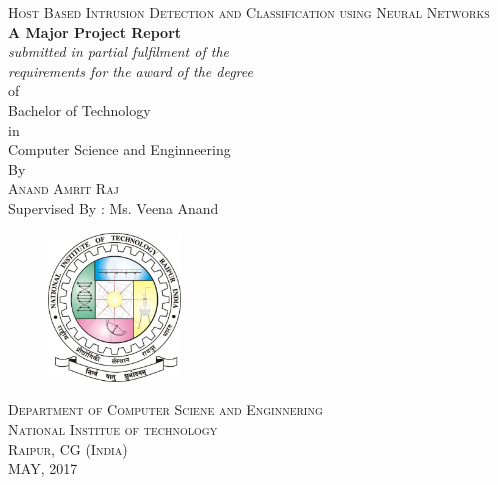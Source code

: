 \documentclass[12pt]{article}
\newcommand{\projectTitle}{Host Based Intrusion Detection and Classification using Neural Networks}
\theoremstyle{definition}
\begin{document}
	\begin{titlepage}
		\vspace*{\fill}
		\begin{center}
			\textsc{\Large \projectTitle}\\
			[0.5in]
			\textbf{A Major Project Report}\\
			[.25in]
			\textit{submitted in partial fulfilment of the} \\
			\textit{requirements for the award of the degree}\\
			[.25in]
			of\\
			[.25in]
			Bachelor of Technology \\
			[.25in]
			in\\
			[.25in]
			Computer Science and Enginneering\\
			By\\
			[.5in]
			\textsc{Anand Amrit Raj}\\
			Supervised By : Ms. Veena Anand\\
			[.5in]
			\begin{figure}[!h]
				\centering
				\includegraphics[width=100pt]{pictures/nitrr-logo.jpg}
			\end{figure}
			\vspace{.25in}
			\textsc{Department of Computer Sciene and Enginnering}\\
			\textsc{National Institue of technology}\\
			\textsc{Raipur, CG (India)}\\
			MAY, 2017
		\end{center}
		\vspace*{\fill}
	\end{titlepage}
	
	
\end{document}
